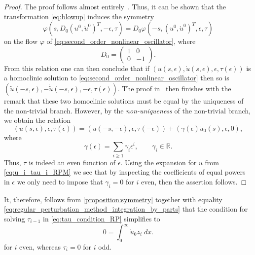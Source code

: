 \begin{proof}
    The proof follows almost entirely~\cite[Proposition 4.2]{Beyn_1994}. Thus,
    it can be shown that the transformation \cref{eq:blowup} induces the
    symmetry
    \[
        \varphi(s, D_0 (u^0, \dot u^0)^T, -\epsilon, \tau)
        =
        D_0 \varphi(-s, (u^0, \dot u^0)^T, \epsilon, \tau)
    \] 
    on the flow $\varphi$ of \cref{eq:second_order_nonlinear_oscillator}, where 
    \[
        D_0 = \begin{pmatrix} 1 & 0 \\ 0 & -1 \end{pmatrix}.
    \] 
    From this relation one can then conclude that if $(u(s,\epsilon), \dot
    u(s,\epsilon), \epsilon, \tau(\epsilon))$ is a homoclinic solution to
    \cref{eq:second_order_nonlinear_oscillator} then so is $(\tilde
    u(-s,\epsilon), -\dot{\tilde{u}}(-s,\epsilon), -\epsilon, \tau(\epsilon))$.
    The proof in~\cite{Beyn_1994} then finishes with the remark that these two
    homoclinic solutions must be equal by the uniqueness of the non-trivial
    branch. However, by the \emph{non-uniqueness} of the non-trivial branch, we
    obtain the relation
    \[
        (u(s,\epsilon), \epsilon, \tau(\epsilon))
        =
        (u(-s,-\epsilon), \epsilon, \tau(-\epsilon))
        +
        (\gamma(\epsilon) \dot u_0(s), \epsilon, 0),
    \]
    where
    \begin{equation}
        \label{eq:gamma}
        \gamma(\epsilon) = \sum_{i\geq 1} \gamma_i \epsilon^i,
        \qquad
        \gamma_i \in \mathbb R.
    \end{equation}
    Thus, $\tau$ is indeed an even function of $\epsilon$. Using the expansion
    for $u$ from \cref{eq:u_i_tau_i_RPM} we see that by inspecting the
    coefficients of equal powers in $\epsilon$ we only need to impose that
    $\gamma_i=0$ for $i$ even, then the assertion follows.
\end{proof}

It, therefore, follows from \cref{proposition:symmetry} together with equality
\cref{eq:regular_perturbation_method_integration_by_parts} that the condition for
solving $\tau_{i-1}$ in \cref{eq:tau_condition_RP} simplifies to
\begin{equation}
    \label{eq:tau_condition_RP}
    0 = \int_0^\infty \dot u_0 z_i \; dx.
\end{equation}
for $i$ even, whereas $\tau_i=0$ for $i$ odd.

